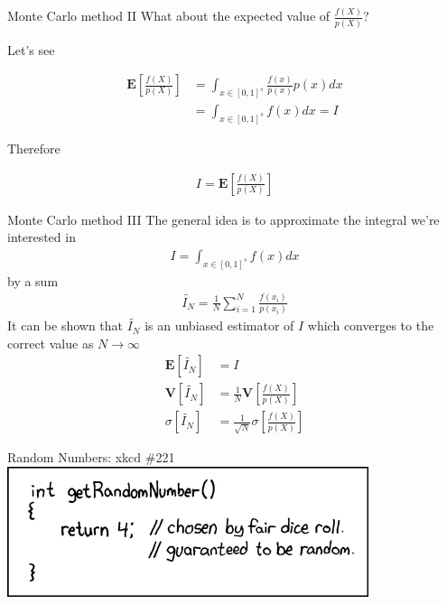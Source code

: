 \documentclass[pdf]
{beamer}
\begin{document}
\begin{frame}{Monte Carlo method II}
  What about the expected value of $\frac{f(X)}{p(X)}$?

  \pause
  \bigskip
  Let's see

  \begin{align*}
    \mathbf{E}[\frac{f(X)}{p(X)}] &= \int_{x \in [0, 1]^s} \frac{f(x)}{p(x)} p(x) dx \\
    & = \int_{x \in [0, 1]^s} f(x) dx = I
  \end{align*}

  \pause
  \bigskip
  Therefore

  \begin{align*}
    I = \mathbf{E}[\frac{f(X)}{p(X)}]
  \end{align*}
\end{frame}

\begin{frame}{Monte Carlo method III}
  \pause
  The general idea is to approximate the integral we're interested in
  \begin{align*}
    I = \int_{x \in [0, 1]^s} f(x) dx
  \end{align*}
  \pause
  by a sum
  \begin{align*}
    \widetilde{I_N} = \frac{1}{N} \sum_{i=1}^{N}{\frac{f(x_i)}{p(x_i)}}
  \end{align*}
  \pause
  It can be shown that $\widetilde{I_N}$ is an unbiased estimator of $I$ which
  converges to the correct value as $N \to \infty$
  \pause
  \begin{align*}
    \mathbf{E}[\widetilde{I_N}] & = I \\
    \mathbf{V}[\widetilde{I_N}] & = \frac{1}{N} \mathbf{V}[\frac{f(X)}{p(X)}] \\
    \sigma[\widetilde{I_N}] & = \frac{1}{\sqrt{N}} \sigma[\frac{f(X)}{p(X)}]
  \end{align*}
\end{frame}

\begin{frame}{Random Numbers: xkcd \#221}
\includegraphics[scale=0.77]{images/xkcd221}
\end{frame}
\end{document}
